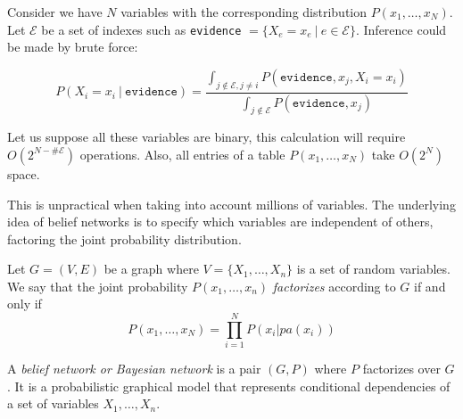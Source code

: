 Consider we have \(N\) variables with the corresponding distribution
\(P(x_1,\dots,x_N)\). Let \(\mathcal{E}\) be a set of indexes such as \texttt{evidence}
\(=\{X_e = x_e \ | \ e \in \mathcal{E}\}\). Inference could be made by brute
force:

\[
P(X_i = x_i \ | \ \texttt{evidence}) = \frac{ \int_{ j \not \in
\mathcal{E}, j \neq i } P(\texttt{evidence}, x_j, X_i = x_i)}{ \int_{ j
\not \in \mathcal{E} } P(\texttt{evidence}, x_j)}
\]

Let us suppose all these variables are binary, this calculation will require
\(O(2^{N-\#\mathcal{E}})\) operations. Also, all entries of a table \(P(x_1,\dots,
x_N)\) take \(O(2^N)\) space.

This is unpractical when taking into account millions of variables. The
underlying idea of belief networks is to specify which variables are independent
of others, factoring the joint probability distribution.

\begin{definition}
Let \(G=(V,E)\) be a graph where \(V = \{X_1,\dots,X_n\}\) is a set of random
variables. We say that the joint
probability \(P(x_1, \dots, x_n)\) \emph{factorizes} according to \(G\) if and
only if
\[
P(x_1,\dots,x_N) = \prod_{i=1}^{N}P(x_i | pa(x_i))
\]
\end{definition}

\begin{definition}
A \emph{belief network or Bayesian network} is a pair \((G, P)\)
where \(P\) factorizes over \(G\). It is a probabilistic graphical model
that represents conditional dependencies of a set of variables \(X_1,\dots, X_n\).
\end{definition}

\begin{figure}
  \centering
    \label{fig:bn_example}
\end{figure}


